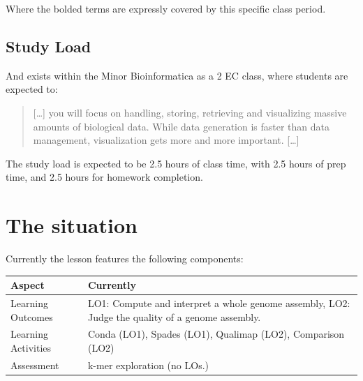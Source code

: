 \documentclass[paper=a4,justified,a4paper]{tufte-handout}
\begin{document}
Where the bolded terms are expressly covered by this specific class
period.

\hypertarget{study-load}{%
\subsection{Study Load}\label{study-load}}

And exists within the Minor Bioinformatica as a 2 EC class, where
students are expected to:

\begin{quote}
{[}\ldots{}{]} you will focus on handling, storing, retrieving and
visualizing massive amounts of biological data. While data generation is
faster than data management, visualization gets more and more important.
{[}\ldots{}{]}
\end{quote}

The study load is expected to be 2.5 hours of class time, with 2.5 hours
of prep time, and 2.5 hours for homework completion.

\hypertarget{the-situation}{%
\section{The situation}\label{the-situation}}

Currently the lesson features the following components:

\begin{longtable}[]{@{}ll@{}}
\toprule
\begin{minipage}[b]{0.31\columnwidth}\raggedright
Aspect\strut
\end{minipage} & \begin{minipage}[b]{0.63\columnwidth}\raggedright
Currently\strut
\end{minipage}\tabularnewline
\midrule
\endhead
\begin{minipage}[t]{0.31\columnwidth}\raggedright
Learning Outcomes\strut
\end{minipage} & \begin{minipage}[t]{0.63\columnwidth}\raggedright
LO1: Compute and interpret a whole genome assembly, LO2: Judge the
quality of a genome assembly.\strut
\end{minipage}\tabularnewline
\begin{minipage}[t]{0.31\columnwidth}\raggedright
Learning Activities\strut
\end{minipage} & \begin{minipage}[t]{0.63\columnwidth}\raggedright
Conda (LO1), Spades (LO1), Qualimap (LO2), Comparison (LO2)\strut
\end{minipage}\tabularnewline
\begin{minipage}[t]{0.31\columnwidth}\raggedright
Assessment\strut
\end{minipage} & \begin{minipage}[t]{0.63\columnwidth}\raggedright
k-mer exploration (no LOs.)\strut
\end{minipage}\tabularnewline
\bottomrule
\end{longtable}
\end{document}

